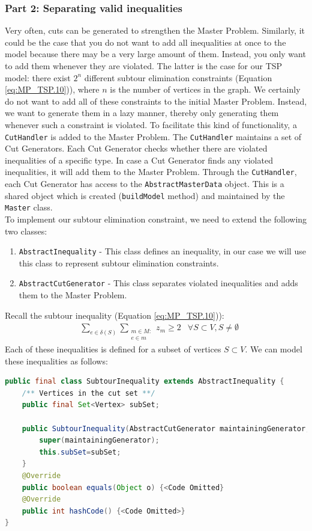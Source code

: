 \documentclass[a4paper]{article}
\newenvironment{myblock}[1]{%
    \tcolorbox[beamer,%
    noparskip,breakable,
    colback=lightBlueCodeBlock,colframe=darkBlueCodeBlock,%
    colbacklower=darkBlueCodeBlock!75!lightBlueCodeBlock,%
    coltitle=blueTitleCodeBlock,
    title=#1]}%
    {\endtcolorbox}
\newcommand{\code}[1]{\lstinline[language=java, style=seminar]!#1!}
\begin{document}
\subsubsection{Part 2: Separating valid inequalities}\label{subsec:cuts}
Very often, cuts can be generated to strengthen the Master Problem. Similarly, it could be the case that you do not want to add all inequalities at once to the model because there may be a very large amount of them. Instead, you only want to add them whenever they are violated. The latter is the case for our TSP model: there exist $2^n$ different subtour elimination constraints (Equation \ref{eq:MP_TSP.10})), where $n$ is the number of vertices in the graph. We certainly do not want to add all of these constraints to the initial Master Problem. Instead, we want to generate them in a lazy manner, thereby only generating them whenever such a constraint is violated. To facilitate this kind of functionality, a \code{CutHandler} is added to the Master Problem. The \code{CutHandler} maintains a set of Cut Generators. Each Cut Generator checks whether there are violated inequalities of a specific type. In case a Cut Generator finds any violated inequalities, it will add them to the Master Problem. Through the \code{CutHandler}, each Cut Generator has access to the \code{AbstractMasterData} object. This is a shared object which is created (\code{buildModel} method) and maintained by the \code{Master} class.\\
To implement our subtour elimination constraint, we need to extend the following two classes:
\begin{enumerate}[nolistsep]
 \item \code{AbstractInequality} - This class defines an inequality, in our case we will use this class to represent subtour elimination constraints.
 \item \code{AbstractCutGenerator} - This class separates violated inequalities and adds them to the Master Problem.
\end{enumerate}
Recall the subtour inequality (Equation \ref{eq:MP_TSP.10})):
\begin{align}
 &\sum_{e\in \delta(S)}\sum_{\substack{m \in M:\\e\in m}} z_m \geq 2 & \forall S\subset V, S\neq \emptyset
\end{align}
Each of these inequalities is defined for a subset of vertices $S\subset V$. We can model these inequalities as follows:
\begin{myblock}{SubtourInequality}
\begin{lstlisting}[language=java, style=eclipseArticle, xleftmargin=2em]  
public final class SubtourInequality extends AbstractInequality {
	/** Vertices in the cut set **/
	public final Set<Vertex> subSet;
	
	public SubtourInequality(AbstractCutGenerator maintainingGenerator, Set<Vertex> subSet) {
		super(maintainingGenerator);
		this.subSet=subSet;
	}
	@Override
	public boolean equals(Object o) {<Code Omitted}
	@Override
	public int hashCode() {<Code Omitted>}
}
\end{lstlisting}
\end{myblock}
\end{document}
